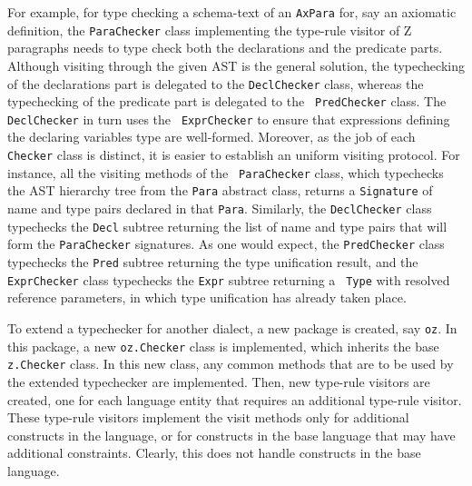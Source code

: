\documentclass{llncs}
\begin{document}
For example, for type checking a schema-text of an {\tt AxPara} for,
say an axiomatic definition, the {\tt ParaChecker} class implementing
the type-rule visitor of Z paragraphs needs to type check both the
declarations and the predicate parts.  Although visiting through the
given AST is the general solution, the typechecking of the
declarations part is delegated to the {\tt DeclChecker} class, whereas
the typechecking of the predicate part is delegated to the {\tt
PredChecker} class.  The {\tt DeclChecker} in turn uses the {\tt
ExprChecker} to ensure that expressions defining the declaring
variables type are well-formed.  Moreover, as the job of each {\tt
Checker} class is distinct, it is easier to establish an uniform
visiting protocol. For instance, all the visiting methods of the {\tt
ParaChecker} class, which typechecks the AST hierarchy tree from the
{\tt Para} abstract class, returns a {\tt Signature} of name and type
pairs declared in that {\tt Para}. Similarly, the {\tt DeclChecker}
class typechecks the {\tt Decl} subtree returning the list of name and
type pairs that will form the {\tt ParaChecker} signatures.  As one
would expect, the {\tt PredChecker} class typechecks the {\tt Pred}
subtree returning the type unification result, and the {\tt
ExprChecker} class typechecks the {\tt Expr} subtree returning a {\tt
Type} with resolved reference parameters, in which type unification
has already taken place.

To extend a typechecker for another dialect, a new package is created, say {\tt oz}.
In this package, a new {\tt oz.Checker} class is implemented, which
inherits the base {\tt z.Checker} class. In this new class, any common
methods that are to be used by the extended typechecker are implemented.
Then, new type-rule visitors are created, one for each language entity that
requires an additional type-rule visitor.  These type-rule visitors
implement the visit methods only for additional constructs in the
language, or for constructs in the base language that may have
additional constraints. Clearly, this does not handle constructs in
the base language.
\end{document}
